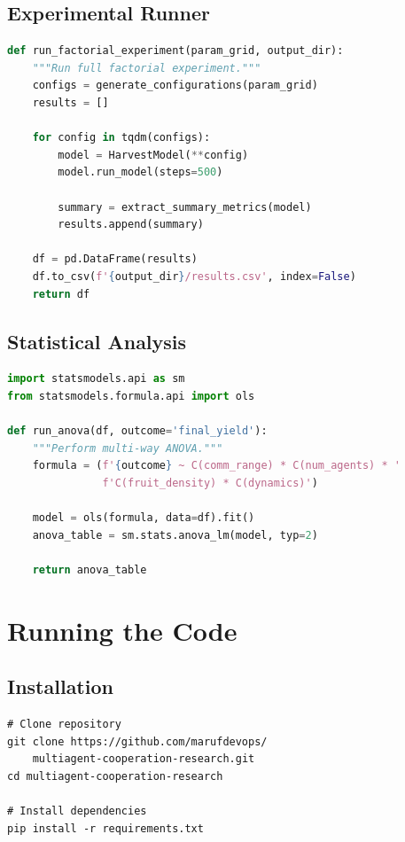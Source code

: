 \subsection{Experimental Runner}

\begin{lstlisting}[language=Python, caption=Factorial experiment runner (excerpt)]
def run_factorial_experiment(param_grid, output_dir):
    """Run full factorial experiment."""
    configs = generate_configurations(param_grid)
    results = []
    
    for config in tqdm(configs):
        model = HarvestModel(**config)
        model.run_model(steps=500)
        
        summary = extract_summary_metrics(model)
        results.append(summary)
    
    df = pd.DataFrame(results)
    df.to_csv(f'{output_dir}/results.csv', index=False)
    return df
\end{lstlisting}

\subsection{Statistical Analysis}

\begin{lstlisting}[language=Python, caption=ANOVA analysis (excerpt)]
import statsmodels.api as sm
from statsmodels.formula.api import ols

def run_anova(df, outcome='final_yield'):
    """Perform multi-way ANOVA."""
    formula = (f'{outcome} ~ C(comm_range) * C(num_agents) * '
               f'C(fruit_density) * C(dynamics)')
    
    model = ols(formula, data=df).fit()
    anova_table = sm.stats.anova_lm(model, typ=2)
    
    return anova_table
\end{lstlisting}

\section{Running the Code}

\subsection{Installation}

\begin{verbatim}
# Clone repository
git clone https://github.com/marufdevops/
    multiagent-cooperation-research.git
cd multiagent-cooperation-research

# Install dependencies
pip install -r requirements.txt
\end{verbatim}

